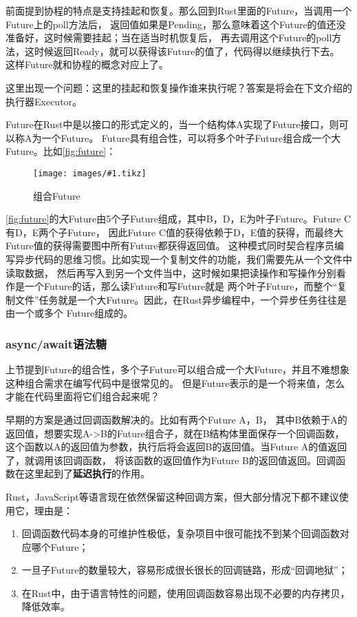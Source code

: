 \documentclass[supercite]{HustGraduPaper}
\newcommand{\cfig}[3]{
  \begin{figure}[htb]
    \centering
    \texttt{[image: images/\#1.tikz]}
    \caption{#3}
    \label{fig:#1}
  \end{figure}
}
\newcommand{\rfig}[1]{\autoref{fig:#1}}
\theoremstyle{definition}
\begin{document}
前面提到协程的特点是支持挂起和恢复。那么回到Rust里面的Future，当调用一个Future上的poll方法后，
返回值如果是Pending，那么意味着这个Future的值还没准备好，这时候需要挂起；当在适当时机恢复后，
再去调用这个Future的poll方法，这时候返回Ready，就可以获得该Future的值了，代码得以继续执行下去。
这样Future就和协程的概念对应上了。\par

这里出现一个问题：这里的挂起和恢复操作谁来执行呢？答案是将会在下文介绍的执行器Executor。\par

Future在Rust中是以接口的形式定义的，当一个结构体A实现了Future接口，则可以称A为一个Future。
Future具有组合性，可以将多个叶子Future组合成一个大Future。比如\rfig{future}：

\cfig{future}{0.4}{组合Future}

\rfig{future}的大Future由5个子Future组成，其中B，D，E为叶子Future。Future C有D，E两个子Future，
因此Future C值的获得依赖于D，E值的获得，而最终大Future值的获得需要图中所有Future都获得返回值。
这种模式同时契合程序员编写异步代码的思维习惯。比如实现一个复制文件的功能，我们需要先从一个文件中读取数据，
然后再写入到另一个文件当中，这时候如果把读操作和写操作分别看作是一个Future的话，那么读Future和写Future就是
两个叶子Future，而整个“复制文件”任务就是一个大Future。因此，在Rust异步编程中，一个异步任务往往是由一个或多个
Future组成的。\par

\subsubsection{async/await语法糖}
上节提到Future的组合性，多个子Future可以组合成一个大Future，并且不难想象这种组合需求在编写代码中是很常见的。
但是Future表示的是一个将来值，怎么才能在代码里面将它们组合起来呢？\par

早期的方案是通过回调函数解决的。比如有两个Future A，B，
其中B依赖于A的返回值，想要实现A->B的Future组合子，就在B结构体里面保存一个回调函数，
这个函数以A的返回值为参数，执行后将会返回B的返回值。当Future A的值返回了，就调用该回调函数，
将该函数的返回值作为Future B的返回值返回。回调函数在这里起到了\textbf{延迟执行}的作用。\par

Rust，JavaScript等语言现在依然保留这种回调方案，但大部分情况下都不建议使用它，理由是：
\begin{enumerate}
  \item 回调函数代码本身的可维护性极低，复杂项目中很可能找不到某个回调函数对应哪个Future；
  \item 一旦子Future的数量较大，容易形成很长很长的回调链路，形成“回调地狱”；
  \item 在Rust中，由于语言特性的问题，使用回调函数容易出现不必要的内存拷贝，降低效率。
\end{enumerate}
\end{document}
